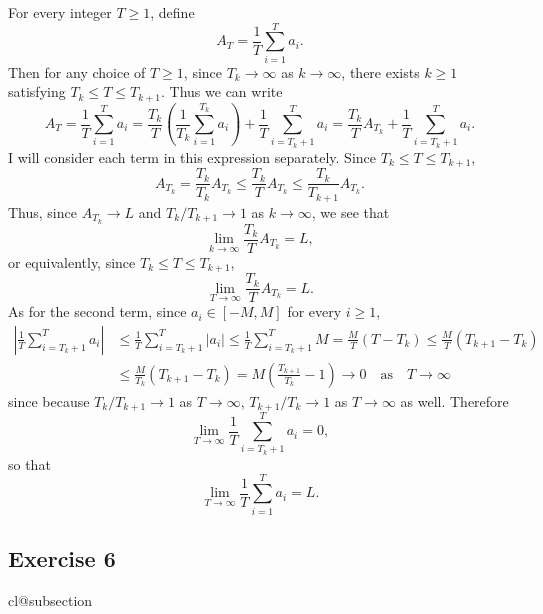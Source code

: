 \documentclass[12pt]{article}
\makeatletter
\def\nullstepcounter#1{%
	\begingroup
		\let\@elt\@stpelt
		\csname cl@#1\endcsname
	\endgroup}
\makeatother
\begin{document}
For every integer $T \geq 1$, define
\begin{equation*}
A_T = \frac{1}{T} \sum_{i=1}^T a_i.
\end{equation*}
Then for any choice of $T \geq 1$, since $T_k \to \infty$ as $k \to \infty$, there exists $k \geq 1$ satisfying $T_k \leq T \leq T_{k+1}$. Thus we can write
\begin{equation*}
A_T = \frac{1}{T} \sum_{i=1}^T a_i = \frac{T_k}{T} \left(\frac{1}{T_k} \sum_{i=1}^{T_k} a_i \right) + \frac{1}{T} \sum_{i=T_k + 1}^T a_i = \frac{T_k}{T} A_{T_k} + \frac{1}{T} \sum_{i=T_k + 1}^T a_i.
\end{equation*}
I will consider each term in this expression separately. Since $T_k \leq T \leq T_{k+1}$,
\begin{equation*}
A_{T_k} = \frac{T_k}{T_k} A_{T_k} \leq \frac{T_k}{T} A_{T_k} \leq \frac{T_k}{T_{k+1}} A_{T_k}.
\end{equation*}
Thus, since $A_{T_k} \to L$ and $T_k / T_{k+1} \to 1$ as $k \to \infty$, we see that
\begin{equation*}
\lim_{k \to \infty} \frac{T_k}{T} A_{T_k} = L,
\end{equation*}
or equivalently, since $T_k \leq T \leq T_{k+1}$,
\begin{equation*}
\lim_{T \to \infty} \frac{T_k}{T} A_{T_k} = L.
\end{equation*}
As for the second term, since $a_i \in [-M, M]$ for every $i \geq 1$,
\begin{align*}
\left| \frac{1}{T} \sum_{i=T_k + 1}^T a_i \right| &\leq \frac{1}{T} \sum_{i=T_k + 1}^T |a_i| \leq \frac{1}{T} \sum_{i=T_k + 1}^T M = \frac{M}{T}(T-T_k) \leq \frac{M}{T}(T_{k+1}-T_k) \\
&\leq \frac{M}{T_k}(T_{k+1}-T_k) = M\left(\frac{T_{k+1}}{T_k} - 1 \right) \to 0 \quad \text{as} \quad T \to \infty
\end{align*}
since because $T_k / T_{k+1} \to 1$ as $T \to \infty$, $T_{k+1} / T_k \to 1$ as $T \to \infty$ as well. Therefore
\begin{equation*}
\lim_{T \to \infty} \frac{1}{T} \sum_{i=T_k + 1}^T a_i = 0,
\end{equation*}
so that
\begin{equation*}
\lim_{T \to \infty} \frac{1}{T} \sum_{i=1}^T a_i = L.
\end{equation*}

\subsection*{Exercise 6}
\nullstepcounter{subsection}
\end{document}
